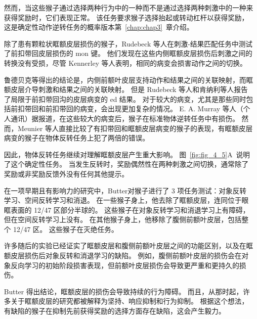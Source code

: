 然而，当这些猴子通过选择两种行为中的一种而不是通过选择两种刺激中的一种来获得奖励时，它们表现正常。
该任务要求猴子选择抬起或转动杠杆以获得奖励，这是确定性动作逆转任务的概率版本第~\ref{chap:chap3}~章介绍。\par


除了患有颗粒状眶额皮层损伤的猴子，Rudebeck 等人在刺激-结果匹配任务中测试了前扣带回皮层损伤的 mon 键。
他们发现在这些内侧眶额皮层损伤后刺激之间的转换没有受损，尽管 Kennerley 等人\cite{kennerley2006optimal}表明，相同的病变会损害动作之间的切换。\par



鲁德贝克等得出的结论是，内侧前额叶皮层支持动作和结果之间的关联映射，而眶额皮层介导刺激和结果之间的关联映射。
但是 Rudebeck 等人和肯纳利等人报告了局限于前扣带回沟的皮层病变的 ed 结果。
对于较大的病变，尤其是那些同时包括前扣带回和前扣带回的病变，会出现更加复杂的情况。
E. A. Murray 等人（个人通讯）据报道，在这些较大的病变后，猴子在标准物体逆转任务中有损伤。
然而，Meunier 等人\cite{meunier1997effects}直接比较了有扣带回和眶额皮层病变的猴子的表现，有眶额皮层病变的猴子在物体反转任务上犯了两倍的错误。  \par


因此，物体反转任务继续对理解眶额皮层产生重大影响。
图~\ref{fig:fig_4_5}A~说明了这个确定性任务。
当发生反转时，奖励偶然性在两种刺激之间切换，通常除了奖励或非奖励反馈外没有任何其他提示。\par


在一项早期且有影响力的研究中，Butter\cite{butters1969retention}对猴子进行了 3 项任务测试：对象反转学习、空间反转学习和消退。
在一些猴子身上，他去除了眶额皮层，连同位于眼眶表面的 12/47 区部分半球的。
这些猴子在对象反转学习和消退学习上有障碍，但在空间反转学习上没有。
在其他猴子身上，他移除了腹侧前额叶皮层，包括整个 12/47 区。
这些猴子在灭绝任务。\par


许多随后的实验已经证实了眶额皮层和腹侧前额叶皮层之间的功能区别，以及在眶额皮层损伤后对象反转和消退学习的缺陷\cite{dias1997dissociable,izquierdo2004bilateral}。
例如，腹侧前额叶皮层的损伤会在对象反向学习的初始阶段损害表现，但前额叶皮层损伤会导致更严重和更持久的损伤\cite{rygula2010differential}。\par


Butter 得出结论，眶额皮层的损伤会导致持续的行为障碍。
而且，从那时起，许多关于眶额皮层的研究都被解释为坚持、响应抑制和行为抑制\cite{roberts2000inhibitory}。
根据这个想法，有缺陷的猴子在抑制先前获得奖励的选择方面存在缺陷，这会产生毅力。\par


